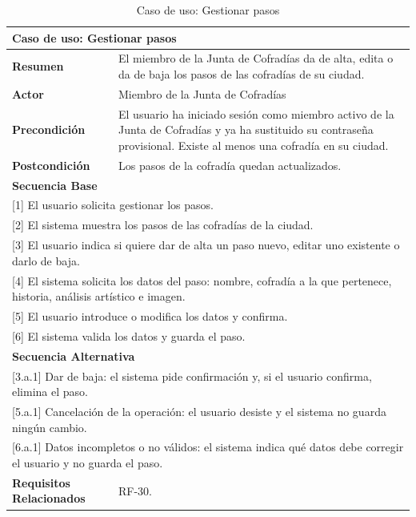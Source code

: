 \begin{table}[h!]
    \centering
    \renewcommand{\arraystretch}{1.5}

    \begin{tabular}{|p{4cm}|p{11cm}|}
        \hline
        \multicolumn{2}{|l|}{\textbf{Caso de uso: Gestionar pasos}} \\
        \hline
        \textbf{Resumen} & El miembro de la Junta de Cofradías da de alta, edita o da de baja los pasos de las cofradías de su ciudad. \\
        \hline
        \textbf{Actor} & Miembro de la Junta de Cofradías \\
        \hline
        \textbf{Precondición} & El usuario ha iniciado sesión como miembro activo de la Junta de Cofradías y ya ha sustituido su contraseña provisional. Existe al menos una cofradía en su ciudad. \\
        \hline
        \textbf{Postcondición} & Los pasos de la cofradía quedan actualizados. \\
        \hline
        \multicolumn{2}{|l|}{\textbf{Secuencia Base}} \\
        \hline
        \multicolumn{2}{|p{15cm}|}{ [1] El usuario solicita gestionar los pasos. } \\
        \hline
        \multicolumn{2}{|p{15cm}|}{ [2] El sistema muestra los pasos de las cofradías de la ciudad. } \\
        \hline
        \multicolumn{2}{|p{15cm}|}{ [3] El usuario indica si quiere dar de alta un paso nuevo, editar uno existente o darlo de baja. } \\
        \hline
        \multicolumn{2}{|p{15cm}|}{ [4] El sistema solicita los datos del paso: nombre, cofradía a la que pertenece, historia, análisis artístico e imagen. } \\
        \hline
        \multicolumn{2}{|p{15cm}|}{ [5] El usuario introduce o modifica los datos y confirma. } \\
        \hline
        \multicolumn{2}{|p{15cm}|}{ [6] El sistema valida los datos y guarda el paso. } \\
        \hline
        \multicolumn{2}{|l|}{\textbf{Secuencia Alternativa}} \\
        \hline
        \multicolumn{2}{|p{15cm}|}{ [3.a.1] Dar de baja: el sistema pide confirmación y, si el usuario confirma, elimina el paso. } \\
        \hline
        \multicolumn{2}{|p{15cm}|}{ [5.a.1] Cancelación de la operación: el usuario desiste y el sistema no guarda ningún cambio. } \\
        \hline
        \multicolumn{2}{|p{15cm}|}{ [6.a.1] Datos incompletos o no válidos: el sistema indica qué datos debe corregir el usuario y no guarda el paso. } \\
        \hline
        \textbf{Requisitos Relacionados} & RF-30. \\
        \hline
    \end{tabular}
    \caption{Caso de uso: Gestionar pasos}
\end{table}

